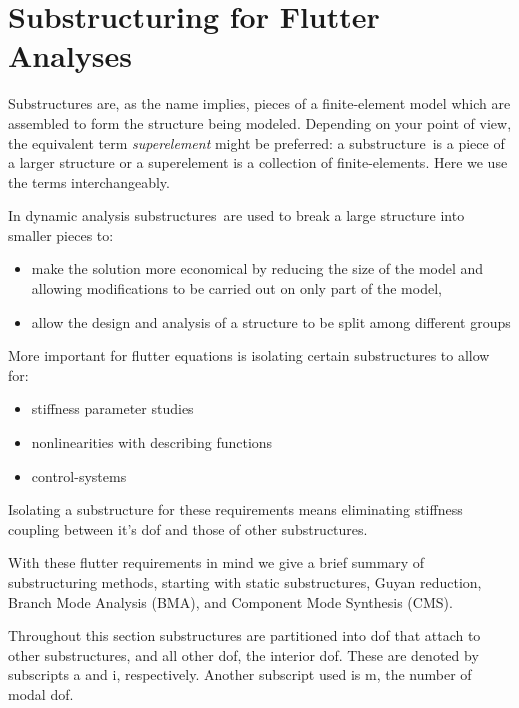 \documentclass[11pt,openany,twoside]{book}
\numberwithin{equation}{section}		%
\newcommand{\Newterm}[1]{{\em #1}}	%
\newcommand{\Ss}{substructure}
\newcommand{\Sss}{substructures}
\begin{document}
\newpage

\section{Substructuring for Flutter Analyses}\label{sect:ss-intro}
Substructures are, as the name implies, pieces of a finite-element
model which are assembled to form the structure being modeled.
Depending on your point of view, the equivalent term
\Newterm{superelement} might be preferred:
a \Ss\ is a piece of a larger structure or
a superelement is a collection of finite-elements.
Here we use the terms interchangeably.

In dynamic analysis
\Sss\ are used to break a large structure into smaller pieces to:
\begin{itemize}
\item make the solution more economical by reducing the size of the model
	and allowing modifications to be carried out on only part of the model,
\item allow the design and analysis of a structure to be split
	among different groups
\end{itemize}
More important for flutter equations is isolating certain substructures to allow for:
\begin{itemize}
\item stiffness parameter studies
\item nonlinearities with describing functions
\item control-systems
\end{itemize}
Isolating a substructure for these requirements means eliminating stiffness
coupling between it's dof and those of other substructures.

With these flutter requirements in mind we
give a brief summary of substructuring methods, starting with static
substructures, Guyan reduction, Branch Mode Analysis (BMA), and Component Mode
Synthesis (CMS).

Throughout this section substructures are partitioned into dof that attach
to other substructures, and all other dof, the interior dof. These are denoted
by subscripts a and i, respectively. Another subscript used is m, the number of
modal dof.
\end{document}
